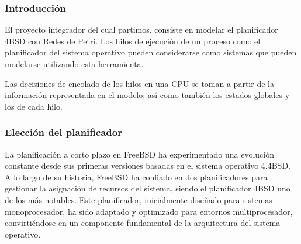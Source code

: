 

\subsubsection{Introducción}

El proyecto integrador del cual partimos, consiste en modelar el planificador 4BSD con Redes de Petri. Los hilos de ejecución de un proceso como el planificador del sistema operativo pueden considerarse como sistemas que pueden modelarse utilizando esta herramienta.\par

Las decisiones de encolado de los hilos en una CPU se toman a partir de la información representada en el modelo; así como también los estados globales y los de cada hilo.\par


\subsubsection{Elección del planificador}

La planificación a corto plazo en FreeBSD ha experimentado una evolución constante desde sus primeras versiones basadas en el sistema operativo 4.4BSD\cite{bib3}. A lo largo de su historia, FreeBSD ha confiado en dos planificadores para gestionar la asignación de recursos del sistema, siendo el planificador 4BSD uno de los más notables. Este planificador, inicialmente diseñado para sistemas monoprocesador, ha sido adaptado y optimizado para entornos multiprocesador, convirtiéndose en un componente fundamental de la arquitectura del sistema operativo.\par

